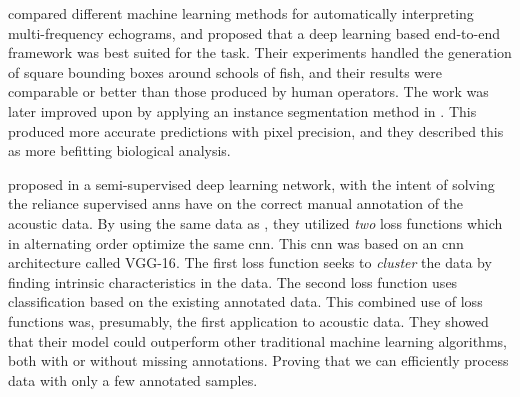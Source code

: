 \citet{marques2021detecting} compared different machine learning methods for automatically interpreting multi-frequency echograms, and proposed that a deep learning based end-to-end framework was best suited for the task. Their experiments handled the generation of square bounding boxes around schools of fish, and their results were comparable or better than those produced by human operators. The work was later improved upon by applying an instance segmentation method in \citeyear{marques2021instance}\cite{marques2021instance}. This produced more accurate predictions with pixel precision, and they described this as more befitting biological analysis.
 
\citet{semtantic-segm2021choi} proposed in \citeyear{semtantic-segm2021choi} a semi-supervised deep learning network, with the intent of solving the reliance supervised \gls{ann}s have on the correct manual annotation of the acoustic data. By using the same data as \citet{brautaset2020acoustic}, they utilized \textit{two} loss functions which in alternating order optimize the same \gls{cnn}. This \gls{cnn} was based on an \gls{cnn} architecture called VGG-16\cite{simonyan2014very}. The first loss function seeks to \textit{cluster} the data by finding intrinsic characteristics in the data. The second loss function uses classification based on the existing annotated data. This combined use of loss functions was, presumably, the first application to acoustic data. They showed that their model could outperform other traditional machine learning algorithms, both with or without missing annotations. Proving that we can efficiently process data with only a few annotated samples.



%        









        
        
        
        
        

        
        
        
        
        
        
